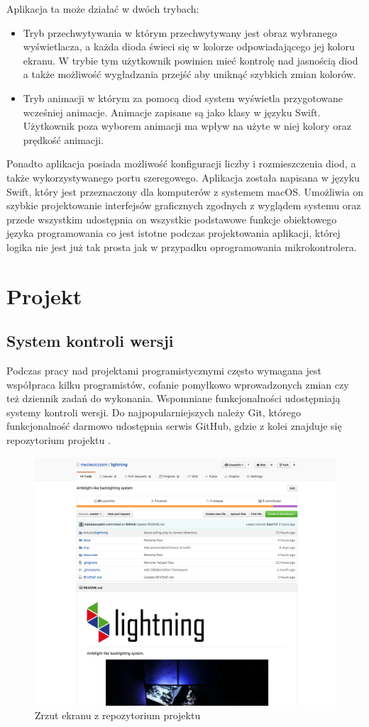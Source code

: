 \documentclass[12pt]{report}
\begin{document}
Aplikacja ta może działać w dwóch trybach:

\begin{itemize}
	\item Tryb przechwytywania w którym przechwytywany jest obraz wybranego wyświetlacza, a każda dioda świeci się w kolorze odpowiadającego jej koloru ekranu. W trybie tym użytkownik powinien mieć kontrolę nad jasnością diod a także możliwość wygładzania przejść aby uniknąć szybkich zmian kolorów.
	\item Tryb animacji w którym za pomocą diod system wyświetla przygotowane wcześniej animacje. Animacje zapisane są jako klasy w języku Swift. Użytkownik poza wyborem animacji ma wpływ na użyte w niej kolory oraz prędkość animacji.
\end{itemize}

Ponadto aplikacja posiada możliwość konfiguracji liczby i rozmieszczenia diod, a także wykorzystywanego portu szeregowego.
Aplikacja została napisana w języku Swift, który jest przeznaczony dla komputerów z systemem macOS. Umożliwia on szybkie projektowanie interfejsów graficznych zgodnych z wyglądem systemu oraz przede wszystkim udostępnia on wszystkie podstawowe funkcje obiektowego języka programowania co jest istotne podczas projektowania aplikacji, której logika nie jest już tak prosta jak w przypadku oprogramowania mikrokontrolera.

\section{Projekt}

\subsection{System kontroli wersji}

Podczas pracy nad projektami programistycznymi często wymagana jest współpraca kilku programistów, cofanie pomyłkowo wprowadzonych zmian czy też dziennik zadań do wykonania. Wspomniane funkcjonalności udostępniają systemy kontroli wersji. Do najpopularniejszych należy Git, którego funkcjonalność darmowo udostępnia serwis   GitHub, gdzie z kolei znajduje się repozytorium projektu \cite{github}.

\begin{figure}[h]
\centering
\includegraphics[width=.7\textwidth]{../resources/github.png}
\caption{Zrzut ekranu z repozytorium projektu}
\label{schemat}
\end{figure}
\end{document}
